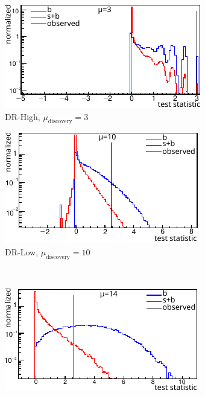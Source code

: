 \begin{figure}[tp]
\centering
\begin{subfigure}{0.50\textwidth}
\centering
\includegraphics[width=\textwidth]{figures/2ljets_test_stat_distribution_drhigh3.pdf}
\caption{DR-High, $\mu_\textrm{discovery}=3$}
\label{fig:2ljets_test_stat_distributions_drhigh}
\end{subfigure}
\hfill
\begin{subfigure}{0.46\textwidth}
\centering
\includegraphics[width=\textwidth]{figures/2ljets_test_stat_distribution_drlow10.pdf}
\caption{DR-Low, $\mu_\textrm{discovery}=10$}
\label{fig:2ljets_test_stat_distributions_drlow}
\end{subfigure}
\\[1.5ex]
\begin{subfigure}{0.46\textwidth}
\centering
\includegraphics[width=\textwidth]{figures/2ljets_test_stat_distribution_droffshell14.pdf}

\end{subfigure}
\end{figure}
